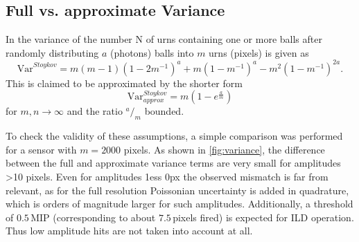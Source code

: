 \documentclass[12pt]{article} %
\begin{document}
\begin{appendices}
\section{Full vs. approximate Variance \cite{PPD}}
\label{sec:variance_para}
In \cite{PPD} the variance of the number N of urns containing one or more balls after randomly distributing $a$ (photons) balls into $m$ urns (pixels) is given as
\begin{equation}
	\mathrm{Var}^{Stoykov} = m(m-1)(1-2m^{-1})^a+m(1-m^{-1})^a-m^2(1-m^{-1})^{2a}.
\end{equation}
This is claimed to be approximated by the shorter form
\begin{equation}
	\mathrm{Var}^{Stoykov}_{approx} = m(1-e^{\frac{a}{m}})
\end{equation}
for $m, n \rightarrow \infty$ and the ratio ${}^a/_m$ bounded.

To check the validity of these assumptions, a simple comparison was performed for a sensor with $m=2000$ pixels. As shown in \autoref{fig:variance}, the difference between the full and approximate variance terms are very small for amplitudes \textgreater 10 pixels. Even for amplitudes \text1ess 0px the observed mismatch is far from relevant, as for the full resolution Poissonian uncertainty is added in quadrature, which is orders of magnitude larger for such amplitudes. Additionally, a threshold of $0.5$\,MIP (corresponding to about $7.5$\,pixels fired) is expected for ILD operation. Thus low amplitude hits are not taken into account at all.


\end{appendices}
\end{document}
